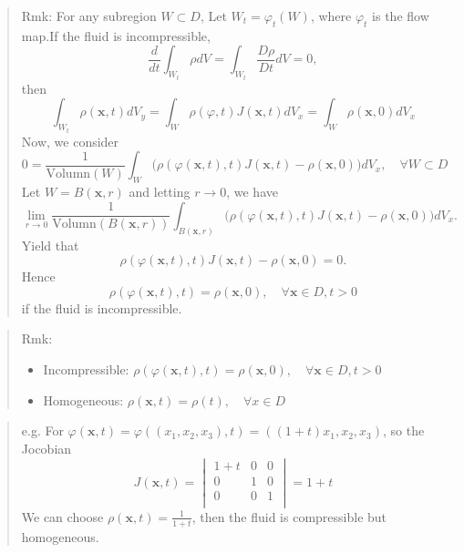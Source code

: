 \begin{quote}
	Rmk:
For any subregion $W\subset D$, Let $W_t=\varphi_t(W)$, where $\varphi_t$ is the flow map.If the fluid is incompressible,
\begin{equation}
\frac{d}{dt}\int_{W_t} \rho dV = \int_{W_t}\frac{D\rho}{Dt} dV = 0,
\end{equation}
then
\begin{equation}
\int_{W_t} \rho(\textbf{x},t) dV_y = \int_{W}\rho(\varphi,t)J(\textbf{x},t)dV_x = \int_{W}\rho(\textbf{x},0) dV_x
\end{equation}
Now, we consider
\begin{equation}
0 = \frac{1}{\text{Volumn}(W)}\int_{W}\bigg(\rho\left(\varphi(\textbf{x},t),t\right)J(\textbf{x},t) - \rho(\textbf{x},0)\bigg) dV_x,\quad \forall W\subset D
\label{eq:unit volumn}
\end{equation}
Let $W=B(\textbf{x},r)$ and letting $r\to 0$, we have
\begin{equation}
\lim_{r\to 0}\frac{1}{\text{Volumn}(B(\textbf{x},r))}\int_{B(\textbf{x},r)}\bigg(\rho\left(\varphi(\textbf{x},t),t\right)J(\textbf{x},t) - \rho(\textbf{x},0)\bigg) dV_x.
\end{equation}
Yield that
\begin{equation}
\rho\left(\varphi(\textbf{x},t),t\right)J(\textbf{x},t) - \rho(\textbf{x},0) = 0.
\end{equation}
Hence
\begin{equation}
\rho\left(\varphi(\textbf{x},t),t\right) =  \rho(\textbf{x},0),\quad \forall \textbf{x}\in D, t>0
\end{equation}
if the fluid is incompressible.
\end{quote}



\begin{quote}
	Rmk:
\begin{itemize}
	\item Incompressible: $\rho\left(\varphi(\textbf{x},t),t\right) =  \rho(\textbf{x},0),\quad \forall \textbf{x}\in D, t>0$
	\item Homogeneous: $\rho (\textbf{x},t) = \rho(t),\quad\forall x\in D$

\end{itemize}

\end{quote}

\begin{quote}
	e.g.
For $\varphi(\textbf{x},t) = \varphi\left((x_1,x_2,x_3),t\right) = ((1+t)x_1,x_2,x_3)$, so the Jocobian
\begin{equation}
J(\textbf{x},t) = \begin{vmatrix}
1+t & 0 & 0\\
0 & 1 & 0\\
0 & 0 & 1\\
\end{vmatrix} = 1+t
\end{equation}
We can choose $\displaystyle \rho(\textbf{x},t) = \frac{1}{1+t}$, then the fluid is compressible but homogeneous.
\end{quote}



